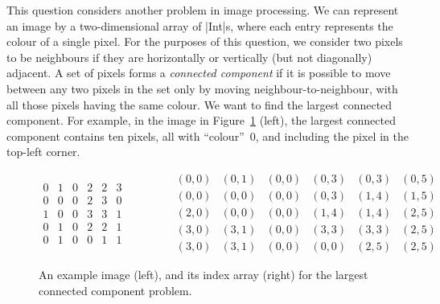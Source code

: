 \begin{question}
This question considers another problem in image processing.  We can represent
an image by a two-dimensional array of |Int|s, where each entry represents the
colour of a single pixel.  For the purposes of this question, we consider two
pixels to be neighbours if they are horizontally or vertically (but not
diagonally) adjacent.  A set of pixels forms a \emph{connected component} if
it is possible to move between any two pixels in the set only by moving
neighbour-to-neighbour, with all those pixels having the same colour.  We want
to find the largest connected component.
For example, in the image in Figure~\ref{fig:image} (left), the largest
connected component contains ten pixels, all with ``colour''~0, and including
the pixel in the top-left corner.


\begin{figure}
\[
\begin{array}{cccccc}
0 & 1 & 0 & 2 & 2 & 3 \\
0 & 0 & 0 & 2 & 3 & 0 \\
1 & 0 & 0 & 3 & 3 & 1 \\
0 & 1 & 0 & 2 & 2 & 1 \\
0 & 1 & 0 & 0 & 1 & 1
\end{array}
\qquad\qquad
\begin{array}{cccccc}
(0,0) & (0,1) & (0,0) & (0,3) & (0,3) & (0,5) \\
(0,0) & (0,0) & (0,0) & (0,3) & (1,4) & (1,5) \\
(2,0) & (0,0) & (0,0) & (1,4) & (1,4) & (2,5) \\
(3,0) & (3,1) & (0,0) & (3,3) & (3,3) & (2,5) \\
(3,0) & (3,1) & (0,0) & (0,0) & (2,5) & (2,5)
\end{array}
\]
\caption{An example image (left), and its index array (right) for the largest
  connected component problem.}
\label{fig:image}
\end{figure}



\end{question}
